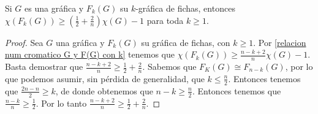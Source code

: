     \begin{teorema}
    \label{relacion num cromatico indep k}
        Si $G$ es una gr\'afica y $F_k(G)$ su $k$-gr\'afica de fichas, entonces
        $\chi (F_k(G)) \geq (\frac{1}{2}+ \frac{2}{n})\chi(G) -1 $ para toda $k
        \geq 1$.
    \end{teorema}
    
    \begin{proof}
        Sea $G$ una gr\'afica y $F_k(G)$ su gr\'afica de fichas, con $k \geq 1$. Por
        \cref{relacion num cromatico G y F(G) con k} tenemos que $\chi(F_k(G)) \geq
        \frac{n-k+2}{n} \chi(G) -1$. Basta demostrar que $\frac{n-k+2}{n} \geq
        \frac{1}{2}+\frac{2}{n}$. Sabemos que $F_K(G) \cong F_{n-k}(G)$, por lo que
        podemos asumir, sin p\'erdida de generalidad, que $k\leq \frac{n}{2}$.
        Entonces tenemos que $\frac{2n-n}{2}\geq k$, de donde obtenemos que $n-k
        \geq \frac{n}{2}$. Entonces tenemos que $\frac{n-k}{n}\geq \frac{1}{2}$. Por
        lo tanto $\frac{n-k+2}{n} \geq \frac{1}{2}+\frac{2}{n}$.
    \end{proof}